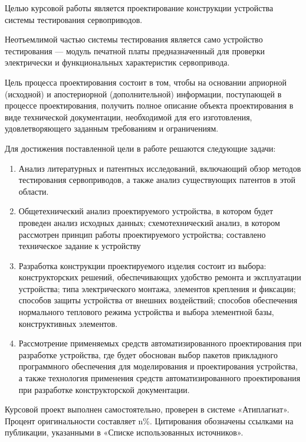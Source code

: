 Целью курсовой работы является проектирование конструкции
устройства системы тестирования сервоприводов.

Неотъемлимой частью системы тестирования является само устройство
тестирования — модуль печатной платы предназначенный для
проверки электрически и функциональных характеристик сервопривода.

Цель процесса проектирования состоит в том, чтобы на основании
априорной (исходной) и апостериорной (дополнительной) информации,
поступающей в процессе проектирования, получить полное описание
объекта проектирования в виде технической документации, необходимой
для его изготовления, удовлетворяющего заданным требованиям и
ограничениям.

Для достижения поставленной цели в работе решаются следующие задачи:
\begin{enumerate}
\item Анализ литературных и патентных исследований, включающий обзор
методов тестирования сервоприводов, а также анализ существующих патентов
в этой области.
\item Общетехнический анализ проектируемого устройства, в котором
будет проведен анализ исходных данных; схемотехнический анализ, в
котором рассмотрен принцип работы проектируемого устройства;
составлено техническое задание к устройству
\item Разработка конструкции проектируемого изделия состоит из выбора:
конструкторских решений, обеспечивающих удобство ремонта и
эксплуатации устройства; типа электрического монтажа, элементов
крепления и фиксации; способов защиты устройства от внешних
воздействий; способов обеспечения нормального теплового режима
устройства и выбора элементной базы, конструктивных элементов.

\item Рассмотрение применяемых средств автоматизированного проектирования
при разработке устройства, где будет обоснован выбор пакетов
прикладного программного обеспечения для моделирования и
проектирования устройства, а также технология применения средств
автоматизированного проектирования при разработке конструкторской
документации.
\end{enumerate}

Курсовой проект выполнен самостоятельно, проверен в системе «Атиплагиат».
Процент оригинальности составляет n\%. Цитирования обозначены
ссылками на публикации, указанными в
«Списке использованных источников».
\newpage
